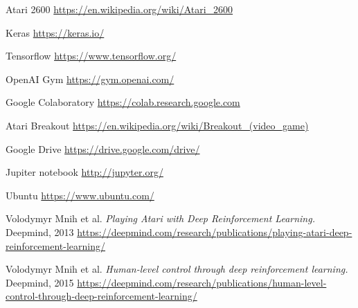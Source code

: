 \documentclass[12pt]{article}
\begin{document}
\begin{thebibliography}{9}


  Atari 2600 \url{https://en.wikipedia.org/wiki/Atari_2600}

Keras \url{https://keras.io/}

Tensorflow \url{https://www.tensorflow.org/}

  OpenAI Gym \url{https://gym.openai.com/}

  Google Colaboratory \url{https://colab.research.google.com}

  Atari Breakout \url{https://en.wikipedia.org/wiki/Breakout_(video_game)}

Google Drive \url{https://drive.google.com/drive/}

Jupiter notebook \url{http://jupyter.org/}

Ubuntu \url{https://www.ubuntu.com/}

  Volodymyr Mnih et al. 
\textit{Playing Atari with Deep Reinforcement Learning.} Deepmind, 2013
   \url{https://deepmind.com/research/publications/playing-atari-deep-reinforcement-learning/}

  Volodymyr Mnih et al. 
\textit{Human-level control through deep reinforcement learning.} Deepmind, 2015
   \url{https://deepmind.com/research/publications/human-level-control-through-deep-reinforcement-learning/}


\end{thebibliography}
\end{document}
